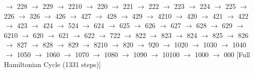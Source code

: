 $\rightarrow$ 228 $\rightarrow$ 229 $\rightarrow$ 2210 $\rightarrow$ 220 $\rightarrow$ 221 $\rightarrow$ 222 $\rightarrow$ 223 $\rightarrow$ 224 $\rightarrow$ 225 $\rightarrow$ 226 $\rightarrow$ 326 $\rightarrow$ 426 $\rightarrow$ 427 $\rightarrow$ 428 $\rightarrow$ 429 $\rightarrow$ 4210 $\rightarrow$ 420 $\rightarrow$ 421 $\rightarrow$ 422 $\rightarrow$ 423 $\rightarrow$ 424 $\rightarrow$ 524 $\rightarrow$ 624 $\rightarrow$ 625 $\rightarrow$ 626 $\rightarrow$ 627 $\rightarrow$ 628 $\rightarrow$ 629 $\rightarrow$ 6210 $\rightarrow$ 620 $\rightarrow$ 621 $\rightarrow$ 622 $\rightarrow$ 722 $\rightarrow$ 822 $\rightarrow$ 823 $\rightarrow$ 824 $\rightarrow$ 825 $\rightarrow$ 826 $\rightarrow$ 827 $\rightarrow$ 828 $\rightarrow$ 829 $\rightarrow$ 8210 $\rightarrow$ 820 $\rightarrow$ 920 $\rightarrow$ 1020 $\rightarrow$ 1030 $\rightarrow$ 1040 $\rightarrow$ 1050 $\rightarrow$ 1060 $\rightarrow$ 1070 $\rightarrow$ 1080 $\rightarrow$ 1090 $\rightarrow$ 10100 $\rightarrow$ 1000 $\rightarrow$ 000 
[Full Hamiltonian Cycle (1331 steps)]


